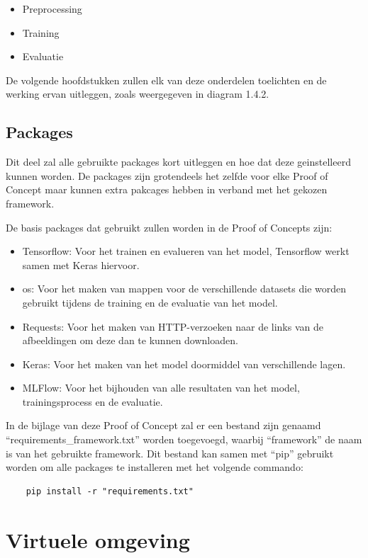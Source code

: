 \begin{itemize}
    \item Preprocessing
    \item Training
    \item Evaluatie
\end{itemize}

De volgende hoofdstukken zullen elk van deze onderdelen toelichten en de werking ervan uitleggen, zoals weergegeven in diagram 1.4.2.
\subsection{Packages}
Dit deel zal alle gebruikte packages kort uitleggen en hoe dat deze geinstelleerd kunnen worden. De packages zijn grotendeels het zelfde voor elke Proof of Concept maar kunnen extra pakcages hebben in verband met het gekozen framework.

De basis packages dat gebruikt zullen worden in de Proof of Concepts zijn:
\begin{itemize}
    \item Tensorflow: Voor het trainen en evalueren van het model, Tensorflow werkt samen met Keras hiervoor.
    \item os: Voor het maken van mappen voor de verschillende datasets die worden gebruikt tijdens de training en de evaluatie van het model.
    \item Requests: Voor het maken van HTTP-verzoeken naar de links van de afbeeldingen om deze dan te kunnen downloaden.
    \item Keras: Voor het maken van het model doormiddel van verschillende lagen.
    \item MLFlow: Voor het bijhouden van alle resultaten van het model, trainingsprocess en de evaluatie.
\end{itemize}

In de bijlage van deze Proof of Concept zal er een bestand zijn genaamd ``requirements\_framework.txt'' worden toegevoegd, waarbij ``framework'' de naam is van het gebruikte framework. Dit bestand kan samen met ``pip'' gebruikt worden om alle packages te installeren met het volgende commando:

\begin{verbatim}
    pip install -r "requirements.txt"
\end{verbatim}
\section{Virtuele omgeving}

